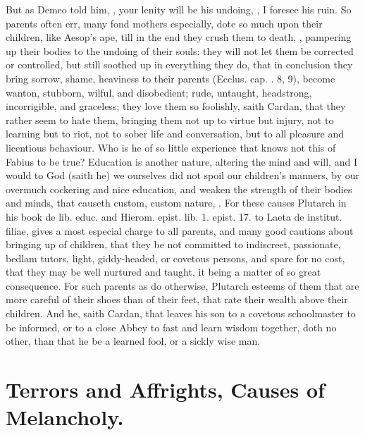 {But as Demeo told him, , your lenity will be his
undoing, , I foresee his ruin. So parents often err, many fond
mothers especially, dote so much upon their children, like
Aesop's ape, till in the end they crush them to death, , pampering up their bodies to the undoing of
their souls: they will not let them be corrected or controlled,
but still soothed up in everything they do, that in conclusion they
bring sorrow, shame, heaviness to their parents (Ecclus. cap. . 8,
9), become wanton, stubborn, wilful, and disobedient; rude, untaught,
headstrong, incorrigible, and graceless; they love them so foolishly,
saith Cardan, that they rather seem to hate them, bringing them
not up to virtue but injury, not to learning but to riot, not to sober
life and conversation, but to all pleasure and licentious behaviour.
Who is he of so little experience that knows not this of Fabius to be
true? Education is another nature, altering the mind and will,
and I would to God (saith he) we ourselves did not spoil our children's
manners, by our overmuch cockering and nice education, and weaken the
strength of their bodies and minds, that causeth custom, custom nature,
\etc{}. For these causes Plutarch in his book de lib. educ. and Hierom.
epist. lib. 1. epist. 17. to Laeta de institut. filiae, gives a most
especial charge to all parents, and many good cautions about bringing
up of children, that they be not committed to indiscreet, passionate,
bedlam tutors, light, giddy-headed, or covetous persons, and spare for
no cost, that they may be well nurtured and taught, it being a matter
of so great consequence. For such parents as do otherwise, Plutarch
esteems of them that are more careful of their shoes than of
their feet, that rate their wealth above their children. And he, saith
Cardan, that leaves his son to a covetous schoolmaster to be
informed, or to a close Abbey to fast and learn wisdom together, doth
no other, than that he be a learned fool, or a sickly wise man.

\section{Terrors and Affrights, Causes of Melancholy.}

}
